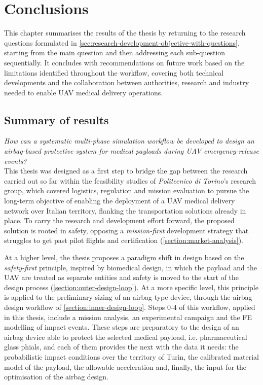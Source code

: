 \chapter{Conclusions}
\label{chapter:conclusions}


This chapter summarises the results of the thesis by returning to the research questions formulated in \cref{sec:research-development-objective-with-questions}, starting from the main question and then addressing each sub-question sequentially. It concludes with recommendations on future work based on the limitations identified throughout the workflow, covering both technical developments and the collaboration between authorities, research and industry needed to enable UAV medical delivery operations.

\section{Summary of results}
\textit{How can a systematic multi-phase simulation workflow be developed to design an airbag-based protective system for medical payloads during UAV emergency-release events?}\\
This thesis was designed as a first step to bridge the gap between the research carried out so far within the feasibility studies of \textit{Politecnico di Torino}'s research group, which covered logistics, regulation and mission evaluation to pursue the long-term objective of enabling the deployment of a UAV medical delivery network over Italian territory, flanking the transportation solutions already in place. To carry the research and development effort forward, the proposed solution is rooted in safety, opposing a \textit{mission-first} development strategy that struggles to get past pilot flights and certification (\cref{section:market-analysis}).

At a higher level, the thesis proposes a paradigm shift in design based on the \textit{safety-first} principle, inspired by biomedical design, in which the payload and the UAV are treated as separate entities and safety is moved to the start of the design process (\cref{section:outer-design-loop}). At a more specific level, this principle is applied to the preliminary sizing of an airbag-type device, through the airbag design workflow of \cref{section:inner-design-loop}. Steps 0-4 of this workflow, applied in this thesis, include a mission analysis, an experimental campaign and the FE modelling of impact events. These steps are preparatory to the design of an airbag device able to protect the selected medical payload, i.e. pharmaceutical glass phials, and each of them provides the next with the data it needs: the probabilistic impact conditions over the territory of Turin, the calibrated material model of the payload, the allowable acceleration and, finally, the input for the optimisation of the airbag design.


